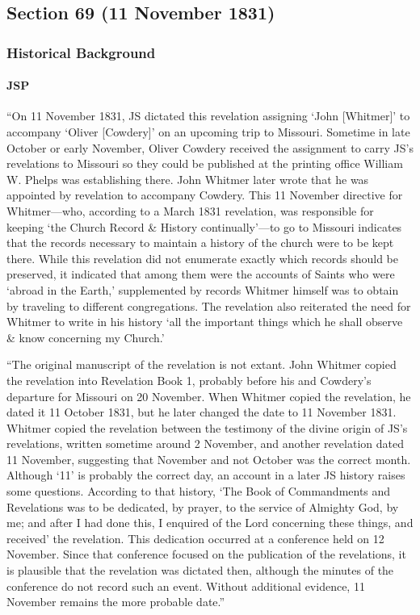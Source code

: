 \subsection{Section 69 (11 November 1831)}
	\label{DC69}
	
	\subsubsection{Historical Background}
		\label{DC69-HB}
		
		\paragraph{JSP}
		
			``On 11 November 1831, JS dictated this revelation assigning `John [Whitmer]' to accompany `Oliver [Cowdery]' on an upcoming trip to Missouri. Sometime in late October or early November, Oliver Cowdery received the assignment to carry JS's revelations to Missouri so they could be published at the printing office William W. Phelps was establishing there. John Whitmer later wrote that he was appointed by revelation to accompany Cowdery. This 11 November directive for Whitmer---who, according to a March 1831 revelation, was responsible for keeping `the Church Record \& History continually'---to go to Missouri indicates that the records necessary to maintain a history of the church were to be kept there. While this revelation did not enumerate exactly which records should be preserved, it indicated that among them were the accounts of Saints who were `abroad in the Earth,' supplemented by records Whitmer himself was to obtain by traveling to different congregations. The revelation also reiterated the need for Whitmer to write in his history `all the important things which he shall observe \& know concerning my Church.'
			
			``The original manuscript of the revelation is not extant. John Whitmer copied the revelation into Revelation Book 1, probably before his and Cowdery's departure for Missouri on 20 November. When Whitmer copied the revelation, he dated it 11 October 1831, but he later changed the date to 11 November 1831. Whitmer copied the revelation between the testimony of the divine origin of JS's revelations, written sometime around 2 November, and another revelation dated 11 November, suggesting that November and not October was the correct month. Although `11' is probably the correct day, an account in a later JS history raises some questions. According to that history, `The Book of Commandments and Revelations was to be dedicated, by prayer, to the service of Almighty God, by me; and after I had done this, I enquired of the Lord concerning these things, and received' the revelation. This dedication occurred at a conference held on 12 November. Since that conference focused on the publication of the revelations, it is plausible that the revelation was dictated then, although the minutes of the conference do not record such an event. Without additional evidence, 11 November remains the more probable date.''
			
